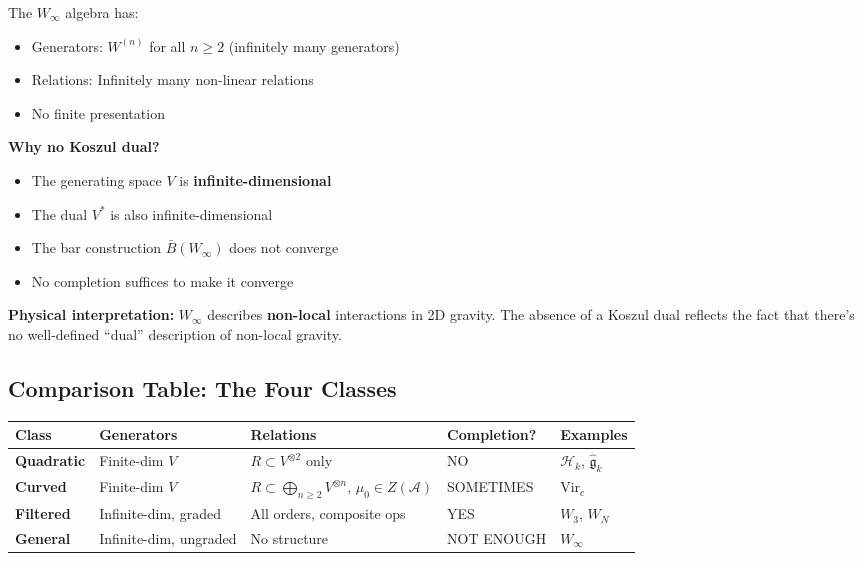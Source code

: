 \begin{example}\label{ex:winfty-no-dual-comprehensive}
The $W_\infty$ algebra has:
\begin{itemize}
\item Generators: $W^{(n)}$ for all $n \geq 2$ (infinitely many generators)
\item Relations: Infinitely many non-linear relations
\item No finite presentation
\end{itemize}

\textbf{Why no Koszul dual?}
\begin{itemize}
\item The generating space $V$ is \textbf{infinite-dimensional}
\item The dual $V^*$ is also infinite-dimensional
\item The bar construction $\bar{B}(W_\infty)$ does not converge
\item No completion suffices to make it converge
\end{itemize}

\textbf{Physical interpretation:}
$W_\infty$ describes \textbf{non-local} interactions in 2D gravity. The absence of a Koszul 
dual reflects the fact that there's no well-defined ``dual'' description of non-local gravity.
\end{example}

\subsection{Comparison Table: The Four Classes}

\begin{center}
\renewcommand{\arraystretch}{1.5}
\begin{tabular}{|p{2.5cm}|p{2.5cm}|p{2.5cm}|p{2.5cm}|p{3cm}|}
\hline
\textbf{Class} & \textbf{Generators} & \textbf{Relations} & \textbf{Completion?} & \textbf{Examples} \\
\hline
\hline
\textbf{Quadratic} & 
Finite-dim $V$ & 
$R \subset V^{\otimes 2}$ only & 
NO &
$\mathcal{H}_k$, $\widehat{\mathfrak{g}}_k$ \\
\hline
\textbf{Curved} & 
Finite-dim $V$ & 
$R \subset \bigoplus_{n \geq 2} V^{\otimes n}$, $\mu_0 \in Z(\mathcal{A})$ & 
SOMETIMES &
$\text{Vir}_c$ \\
\hline
\textbf{Filtered} & 
Infinite-dim, graded & 
All orders, composite ops & 
YES &
$W_3$, $W_N$ \\
\hline
\textbf{General} & 
Infinite-dim, ungraded & 
No structure & 
NOT ENOUGH &
$W_\infty$ \\
\hline
\end{tabular}
\end{center}

